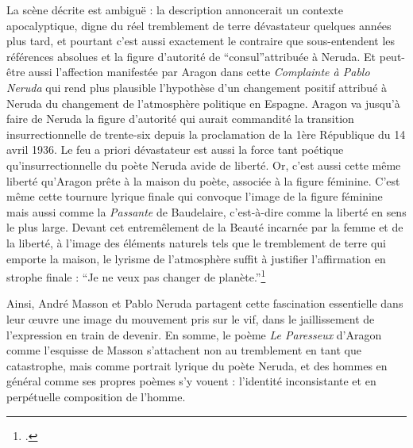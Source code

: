 	La scène décrite est ambiguë : la description annoncerait un contexte apocalyptique, digne du réel tremblement de terre dévastateur quelques années plus tard, et pourtant c’est aussi exactement le contraire que sous-entendent les références absolues et la figure d’autorité de \enquote{consul}attribuée à Neruda. Et peut-être aussi l’affection manifestée par Aragon dans cette \emph{Complainte à Pablo Neruda} qui rend plus plausible l’hypothèse d’un changement positif attribué à Neruda du changement de l’atmosphère politique en Espagne. Aragon va jusqu'à faire de Neruda la figure d’autorité qui aurait commandité la transition insurrectionnelle de trente-six depuis la proclamation de la 1ère République du 14 avril 1936. Le feu a priori dévastateur est aussi la force tant poétique qu’insurrectionnelle du poète Neruda avide de liberté. Or, c’est aussi cette même liberté qu’Aragon prête à la maison du poète, associée à la figure féminine. C’est même cette tournure lyrique finale qui convoque l’image de la figure féminine mais aussi comme la \emph{Passante} de Baudelaire, c'est-à-dire comme la liberté en sens le plus large. Devant cet entremêlement de la Beauté incarnée par la femme et de la liberté, à l’image des éléments naturels tels que le tremblement de terre qui emporte la maison, le lyrisme de l’atmosphère suffit à justifier l’affirmation en strophe finale : \enquote{Je ne veux pas changer de planète.}\footcite{pabloneruda}

Ainsi, André Masson et Pablo Neruda partagent cette fascination essentielle dans leur \oe{}uvre une image du mouvement pris sur le vif, dans le jaillissement de l’expression en train de devenir. En somme, le poème \emph{Le Paresseux} d’Aragon comme l’esquisse de Masson s’attachent non au tremblement en tant que catastrophe, mais comme portrait lyrique du poète Neruda, et des hommes en général comme ses propres poèmes s’y vouent : l’identité inconsistante et en perpétuelle composition de l’homme.


